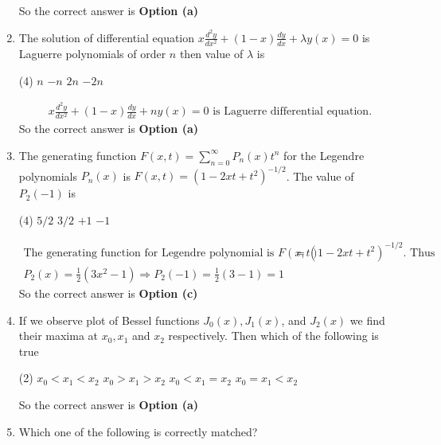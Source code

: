 \begin{enumerate}[label=\color{ocre}\textbf{\arabic*.}]
\begin{answer}
\begin{align*}
	\end{align*}
	So the correct answer is \textbf{Option (a)}
\end{answer}
\item The solution of differential equation $x \frac{d^{2} y}{d x^{2}}+(1-x) \frac{d y}{d x}+\lambda y(x)=0$ is Laguerre polynomials of order $n$ then value of $\lambda$ is
 \begin{tasks}(4)
	\task[\textbf{a.}]$n$
	\task[\textbf{b.}]$-n$
	\task[\textbf{c.}] $2 n$
	\task[\textbf{d.}] $-2 n$
\end{tasks}
\begin{answer}
	\begin{align*}
	x \frac{d^{2} y}{d x^{2}}+(1-x) \frac{d y}{d x}+n y(x)=0\text{ is Laguerre differential equation.}
	\end{align*}
	So the correct answer is \textbf{Option (a)}
\end{answer}
\item The generating function $F(x, t)=\sum_{n=0}^{\infty} P_{n}(x) t^{n}$ for the Legendre polynomials $P_{n}(x)$ is $F(x, t)=\left(1-2 x t+t^{2}\right)^{-1 / 2}$. The value of $P_{2}(-1)$ is
 \begin{tasks}(4)
	\task[\textbf{a.}]$5 / 2$
	\task[\textbf{b.}]$3 / 2$
	\task[\textbf{c.}] $+1$
	\task[\textbf{d.}] $-1$
\end{tasks}
\begin{answer}
	\begin{align*}
	\text{The generating function for Legendre polynomial is }F(x, t)&=\left(1-2 x t+t^{2}\right)^{-1 / 2}.\text{ Thus}\\P_{2}(x)=\frac{1}{2}\left(3 x^{2}-1\right) \Rightarrow P_{2}(-1)=\frac{1}{2}(3-1)=1
	\end{align*}
		So the correct answer is \textbf{Option (c)}
\end{answer}
\item If we observe plot of Bessel functions $J_{0}(x), J_{1}(x)$, and $J_{2}(x)$ we find their maxima at $x_{0}, x_{1}$ and $x_{2}$ respectively. Then which of the following is true
 \begin{tasks}(2)
	\task[\textbf{a.}]$x_{0}<x_{1}<x_{2}$
	\task[\textbf{b.}]$x_{0}>x_{1}>x_{2}$
	\task[\textbf{c.}]$x_{0}<x_{1}=x_{2}$
	\task[\textbf{d.}] $x_{0}=x_{1}<x_{2}$
\end{tasks}
\begin{answer}
	So the correct answer is \textbf{Option (a)}
\end{answer}
\item Which one of the following is correctly matched?\\

\end{enumerate}
